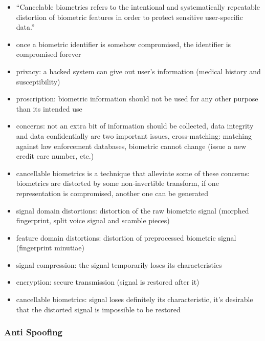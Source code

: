 \documentclass[paper=a4, fontsize=11pt]{scrartcl} %
\numberwithin{equation}{section} %
\numberwithin{figure}{section} %
\numberwithin{table}{section} %
\begin{document}
\begin{itemize}
\item “Cancelable biometrics refers to the intentional and systematically repeatable distortion of biometric features in order to protect sensitive user-specific data.”
\item once a biometric identifier is somehow compromised, the identifier is compromised forever
\item privacy: a hacked system can give out user's information (medical history and susceptibility)
\item proscription: biometric information should not be used for any other purpose than its intended use
\item concerns: not an extra bit of information should be collected, data integrity and data confidentially are two important issues, cross-matching: matching against law enforcement databases, biometric cannot change (issue a new credit care number, etc.)
\item cancellable biometrics is a technique that alleviate some of these concerns: biometrics are distorted by some non-invertible transform, if one representation is compromised, another one can be generated
\item signal domain distortions: distortion of the raw biometric signal (morphed fingerprint, split voice signal and scamble pieces)
\item feature domain distortions: distortion of preprocessed biometric signal (fingerprint minutiae)
\item signal compression: the signal temporarily loses its characteristics
\item encryption: secure transmission (signal is restored after it)
\item cancellable biometrics: signal loses definitely its characteristic, it's desirable that the distorted signal is impossible to be restored
\end{itemize}

\subsubsection{Anti Spoofing}
\end{document}
